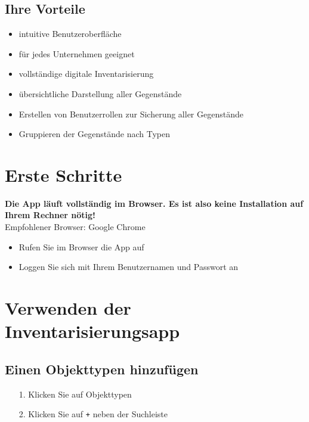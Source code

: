 \documentclass[11pt,a4paper]{report}
\begin{document}
	\subsection{Ihre Vorteile}
	\begin{itemize}
		\item intuitive Benutzeroberfläche
		\item für jedes Unternehmen geeignet
		\item vollständige digitale Inventarisierung
		\item übersichtliche Darstellung aller Gegenstände
		\item Erstellen von Benutzerrollen zur Sicherung aller Gegenstände
		\item Gruppieren der Gegenstände nach Typen
	\end{itemize}
	\section{Erste Schritte}
	\textbf{Die App läuft vollständig im Browser. Es ist also keine Installation auf Ihrem Rechner nötig!}\\
	Empfohlener Browser: Google Chrome
	
	\begin{itemize}
		\item Rufen Sie im Browser die App auf
		\item Loggen Sie sich mit Ihrem Benutzernamen und Passwort an
	\end{itemize}
	
	\section{Verwenden der Inventarisierungsapp}
	\subsection{Einen Objekttypen hinzufügen}
	
	\begin{itemize}
		\item[1.] Klicken Sie auf \glqq{}Objekttypen\grqq{}
		\item[2.] Klicken Sie auf \texttt{+} neben der Suchleiste
	\end{itemize}
\end{document}
